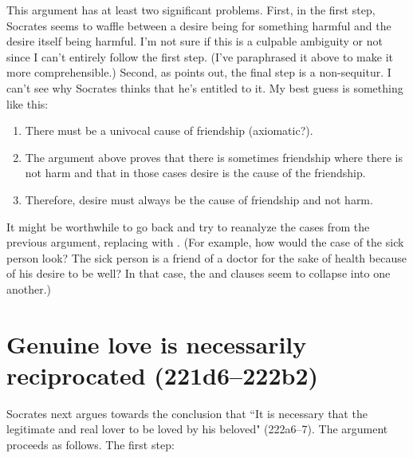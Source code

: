 \documentclass[11pt]{article}
\begin{document}
This argument has at least two significant problems.  First, in the first step,
Socrates seems to waffle between a desire being for something harmful and the
desire itself being harmful.  I'm not sure if this is a culpable ambiguity or
not since I can't entirely follow the first step. (I've paraphrased it above to
make it more comprehensible.)  Second, as \citet{watt1987} points out, the
final step is a non-sequitur.  I can't see why Socrates thinks that he's
entitled to it.  My best guess is something like this:

\begin{enumerate}

    \item There must be a univocal cause of friendship (axiomatic?).

    \item The argument above proves that there is sometimes friendship where
        there is not harm and that in those cases desire is the cause of the
        friendship.

    \item Therefore, desire must always be the cause of friendship and not
        harm.

\end{enumerate}

It might be worthwhile to go back and try to reanalyze the cases from the
previous argument, replacing  with .  (For example, how
would the case of the sick person look?  The sick person is a friend of
a doctor for the sake of health because of his desire to be well?  In that
case, the  and  clauses seem to
collapse into one another.)


\section{Genuine love is necessarily reciprocated (221d6--222b2)}

Socrates next argues towards the conclusion that ``It is necessary that the
legitimate and real lover to be loved by his beloved" (222a6--7).  The
argument proceeds as follows.  The first step:
\end{document}
